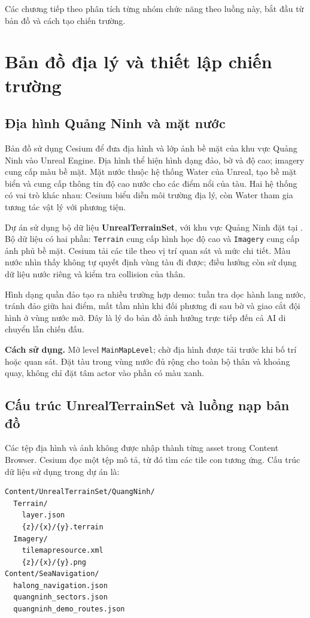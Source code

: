 \documentclass[11pt,a4paper,oneside]{report}
\newcommand{\howto}[1]{\par\smallskip\noindent\textbf{Cách sử dụng.} #1\par}
\begin{document}
Các chương tiếp theo phân tích từng nhóm chức năng theo luồng này, bắt đầu từ bản đồ và cách tạo chiến trường.

\chapter{Bản đồ địa lý và thiết lập chiến trường}
\section{Địa hình Quảng Ninh và mặt nước}
Bản đồ sử dụng Cesium để đưa địa hình và lớp ảnh bề mặt của khu vực Quảng Ninh vào Unreal Engine. Địa hình thể hiện hình dạng đảo, bờ và độ cao; imagery cung cấp màu bề mặt. Mặt nước thuộc hệ thống Water của Unreal, tạo bề mặt biển và cung cấp thông tin độ cao nước cho các điểm nổi của tàu. Hai hệ thống có vai trò khác nhau: Cesium biểu diễn môi trường địa lý, còn Water tham gia tương tác vật lý với phương tiện.

Dự án sử dụng bộ dữ liệu \textbf{UnrealTerrainSet}, với khu vực Quảng Ninh đặt tại . Bộ dữ liệu có hai phần: \texttt{Terrain} cung cấp hình học độ cao và \texttt{Imagery} cung cấp ảnh phủ bề mặt. Cesium tải các tile theo vị trí quan sát và mức chi tiết. Màu nước nhìn thấy không tự quyết định vùng tàu đi được; điều hướng còn sử dụng dữ liệu nước riêng và kiểm tra collision của thân.

Hình dạng quần đảo tạo ra nhiều trường hợp demo: tuần tra dọc hành lang nước, tránh đảo giữa hai điểm, mất tầm nhìn khi đối phương đi sau bờ và giao cắt đội hình ở vùng nước mở. Đây là lý do bản đồ ảnh hưởng trực tiếp đến cả AI di chuyển lẫn chiến đấu.
\howto{Mở level \texttt{MainMapLevel}; chờ địa hình được tải trước khi bố trí hoặc quan sát. Đặt tàu trong vùng nước đủ rộng cho toàn bộ thân và khoảng quay, không chỉ đặt tâm actor vào phần có màu xanh.}

\section{Cấu trúc UnrealTerrainSet và luồng nạp bản đồ}
Các tệp địa hình và ảnh không được nhập thành từng asset trong Content Browser. Cesium đọc một tệp mô tả, từ đó tìm các tile con tương ứng. Cấu trúc dữ liệu sử dụng trong dự án là:
\begin{lstlisting}
Content/UnrealTerrainSet/QuangNinh/
  Terrain/
    layer.json
    {z}/{x}/{y}.terrain
  Imagery/
    tilemapresource.xml
    {z}/{x}/{y}.png
Content/SeaNavigation/
  halong_navigation.json
  quangninh_sectors.json
  quangninh_demo_routes.json
\end{lstlisting}
\end{document}

